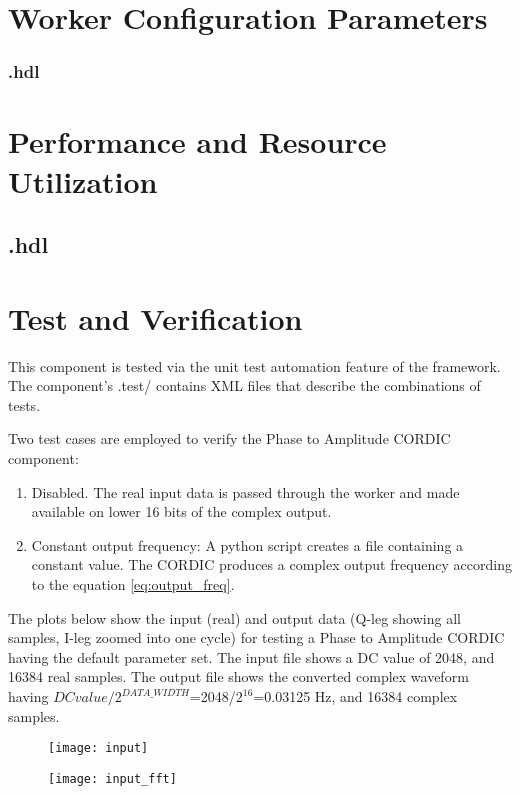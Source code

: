 \begin{landscape}
\section*{Worker Configuration Parameters}
\subsubsection*{\comp.hdl}
%
\section*{Performance and Resource Utilization}
\subsection*{\comp.hdl}
%
\end{landscape}
\newpage

\section*{Test and Verification}
This component is tested via the unit test automation feature of the framework.  The component's .test/ contains XML files that describe the combinations of tests.\medskip

Two test cases are employed to verify the Phase to Amplitude CORDIC component:

\begin{enumerate}
	\item Disabled. The real input data is passed through the worker and made available on lower 16 bits of the complex output.
	\item Constant output frequency: A python script creates a file containing a constant value. The CORDIC produces a complex output frequency according to the equation \ref{eq:output_freq}.
\end{enumerate}

The plots below show the input (real) and output data (Q-leg showing all samples, I-leg zoomed into one cycle) for testing a Phase to Amplitude CORDIC having the default parameter set. The input file shows a DC value of 2048, and 16384 real samples.  The output file shows the converted complex waveform having $DC value/2^{DATA\_WIDTH}$=2048/$2^{16}$=0.03125 Hz, and 16384 complex samples.

\begin{figure}[ht]
	\centering
	\begin{minipage}{.5\textwidth}
		\centering\texttt{[image: input]}
		\label{fig:input_tdomain}
	\end{minipage}%
	\begin{minipage}{.5\textwidth}
		\centering\texttt{[image: input\_fft]}
		\label{fig:input_fdomain}
	\end{minipage}
\end{figure}

